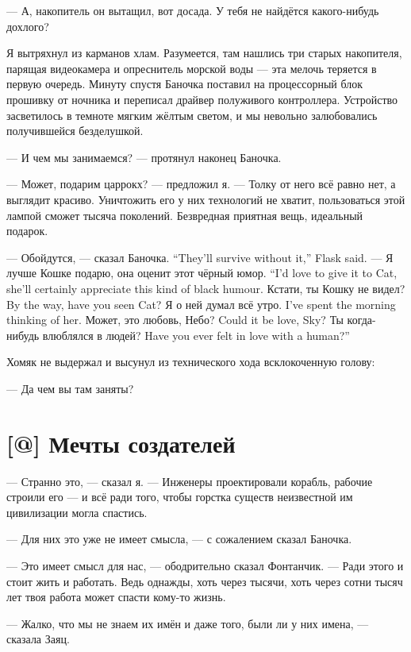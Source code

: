--- А, накопитель он вытащил, вот досада.
У тебя не найдётся какого-нибудь дохлого?

Я вытряхнул из карманов хлам.
Разумеется, там нашлись три старых накопителя, парящая видеокамера и опреснитель морской воды --- эта мелочь теряется в первую очередь.
Минуту спустя Баночка поставил на процессорный блок прошивку от ночника и переписал драйвер полуживого контроллера.
Устройство засветилось в темноте мягким жёлтым светом, и мы невольно залюбовались получившейся безделушкой.

--- И чем мы занимаемся? --- протянул наконец Баночка.

--- Может, подарим царрокх? --- предложил я.
--- Толку от него всё равно нет, а выглядит красиво.
Уничтожить его у них технологий не хватит, пользоваться этой лампой сможет тысяча поколений.
Безвредная приятная вещь, идеальный подарок.

{--- Обойдутся, --- сказал Баночка.}
{``They'll survive without it,'' Flask said.}
{--- Я лучше Кошке подарю, она оценит этот чёрный юмор.}
{``I'd love to give it to Cat, she'll certainly appreciate this kind of black humour.}
{Кстати, ты Кошку не видел?}
{By the way, have you seen Cat?}
{Я о ней думал всё утро.}
{I've spent the morning thinking of her.}
{Может, это любовь, Небо?}
{Could it be love, Sky?}
{Ты когда-нибудь влюблялся в людей?}
{Have you ever felt in love with a human?''}

Хомяк не выдержал и высунул из технического хода всклокоченную голову:

--- Да чем вы там заняты?

\section{[@] Мечты создателей}

\textspace

--- Странно это, --- сказал я.
--- Инженеры проектировали корабль, рабочие строили его --- и всё ради того, чтобы горстка существ неизвестной им цивилизации могла спастись.

--- Для них это уже не имеет смысла, --- с сожалением сказал Баночка.

--- Это имеет смысл для нас, --- ободрительно сказал Фонтанчик.
--- Ради этого и стоит жить и работать.
Ведь однажды, хоть через тысячи, хоть через сотни тысяч лет твоя работа может спасти кому-то жизнь.

--- Жалко, что мы не знаем их имён и даже того, были ли у них имена, --- сказала Заяц.


